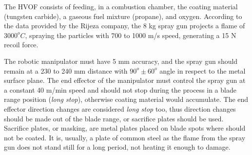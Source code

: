The HVOF consists of feeding, in a combustion chamber, the coating material
(tungsten carbide), a gaseous fuel mixture (propane), and oxygen. According to
the data provided by the Rijeza company, the 8 kg spray gun projects a flame of
$3000^oC$, spraying the particles with 700 to 1000 m/s speed, generating a
15 N recoil force.

The robotic manipulator must have 5 mm accuracy, and the spray gun should remain
at a 230 to 240 mm distance with $90^o\pm 60^o$ angle in respect to the metal
surface plane. The end effector of the manipulator must control the spray
gun at a constant 40 m/min speed and should not stop during the process in a blade range
position (\textit{long stop}), otherwise coating material would accumulate.
The end effector direction changes are considered \textit{long stop} too, thus
direction changes should be made out of the blade range, or sacrifice plates
should be used. Sacrifice plates, or masking, are metal plates placed on blade
spots where should not be coated. It is, usually, a plate of common steel as the
flame from the spray gun does not stand still for a long period, not heating it
enough to damage. 

